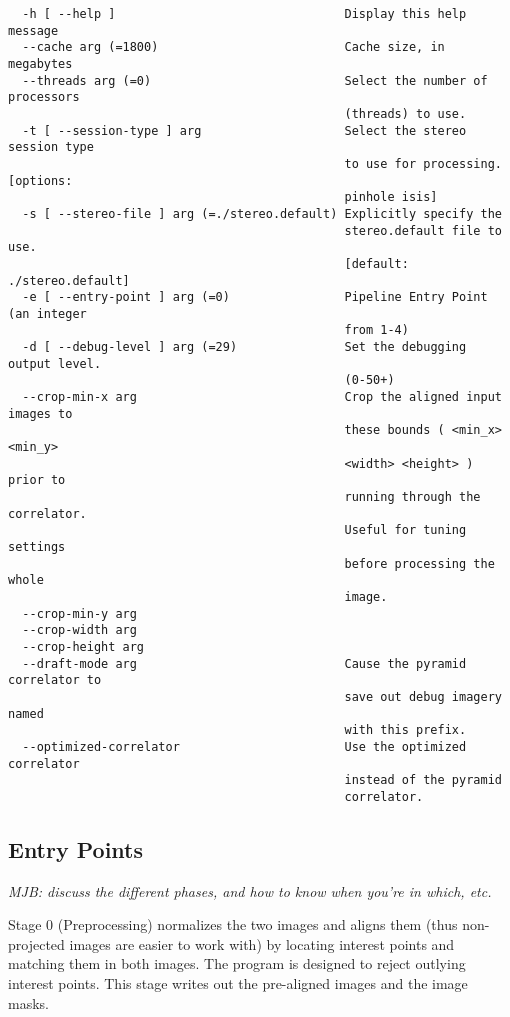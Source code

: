 \begin{verbatim}
  -h [ --help ]                                Display this help message
  --cache arg (=1800)                          Cache size, in megabytes
  --threads arg (=0)                           Select the number of processors 
                                               (threads) to use.
  -t [ --session-type ] arg                    Select the stereo session type 
                                               to use for processing. [options:
                                               pinhole isis]
  -s [ --stereo-file ] arg (=./stereo.default) Explicitly specify the 
                                               stereo.default file to use. 
                                               [default: ./stereo.default]
  -e [ --entry-point ] arg (=0)                Pipeline Entry Point (an integer
                                               from 1-4)
  -d [ --debug-level ] arg (=29)               Set the debugging output level. 
                                               (0-50+)
  --crop-min-x arg                             Crop the aligned input images to
                                               these bounds ( <min_x> <min_y> 
                                               <width> <height> ) prior to 
                                               running through the correlator. 
                                               Useful for tuning settings 
                                               before processing the whole 
                                               image.
  --crop-min-y arg
  --crop-width arg
  --crop-height arg
  --draft-mode arg                             Cause the pyramid correlator to 
                                               save out debug imagery named 
                                               with this prefix.
  --optimized-correlator                       Use the optimized correlator 
                                               instead of the pyramid 
                                               correlator.
\end{verbatim}

\subsection{Entry Points}
\label{entrypoints}

\emph{MJB: discuss the different phases, and how to know when you're
in which, etc.}

Stage 0 (Preprocessing) normalizes the two images and aligns them
(thus non-projected images are easier to work with) by locating
interest points and matching them in both images. The program is
designed to reject outlying interest points.  This stage writes out
the pre-aligned images and the image masks.

